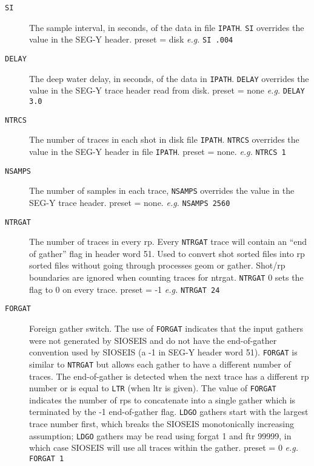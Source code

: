 \begin{description}
\item[\texttt{SI}]    The sample interval, in seconds, of the data in file
         \texttt{IPATH}.  \texttt{SI} overrides the value in the SEG-Y header.
         \Gls{preset} = disk  \textit{e.g.}   \texttt{SI .004}

\item[\texttt{DELAY}] The deep water delay, in seconds, of the data in \texttt{IPATH}.
         \texttt{DELAY} overrides the value in the SEG-Y trace header read from disk.
         \Gls{preset} = none  \textit{e.g.}  \texttt{DELAY 3.0}

\item[\texttt{NTRCS}] The number of traces in each \gls{shot} in disk file \texttt{IPATH}.  \texttt{NTRCS}
         overrides the value in the SEG-Y header in file \texttt{IPATH}.
         \Gls{preset} = none. \textit{e.g.}   \texttt{NTRCS 1}

\item[\texttt{NSAMPS}] The number of samples in each trace,  \texttt{NSAMPS} overrides the
         value in the SEG-Y trace header.
         \Gls{preset} = none. \textit{e.g.}   \texttt{NSAMPS 2560}

\item[\texttt{NTRGAT}] The number of traces in every \gls{rp}.  Every \texttt{NTRGAT} trace
         will contain an ``end of gather'' flag in header word 51.
         Used to convert \gls{shot} sorted files into \gls{rp} sorted files
         without going through processes geom or \gls{gather}.  Shot/\gls{rp}
         boundaries are ignored when counting traces for ntrgat.
         \texttt{NTRGAT} 0 sets the flag to 0 on every trace.
         \Gls{preset} = -1       \textit{e.g.}    \texttt{NTRGAT 24}

\item[\texttt{FORGAT}] Foreign \gls{gather} switch.  The use of \texttt{FORGAT} indicates that
         the input \glspl{gather} were not generated by SIOSEIS and do not
         have the end-of-gather convention used by SIOSEIS (a -1 in
         SEG-Y header word 51).  \texttt{FORGAT} is similar to \texttt{NTRGAT} but
         allows each \gls{gather} to have a different number of traces.
         The end-of-gather is detected when the next trace has a
         different \gls{rp} number or is equal to \texttt{LTR} (when ltr is given).
         The value of \texttt{FORGAT} indicates the number of \glspl{rp} to concatenate
         into a single \gls{gather} which is terminated by the -1
         end-of-gather flag.  \texttt{LDGO} \glspl{gather} start with the largest
         trace number first, which breaks the SIOSEIS
         monotonically increasing assumption; \texttt{LDGO} \glspl{gather} may be
         read using forgat 1 and ftr 99999, in which case SIOSEIS
         will use all traces within the \gls{gather}.
         \Gls{preset} = 0     \textit{e.g.} \texttt{FORGAT 1}


\end{description}
